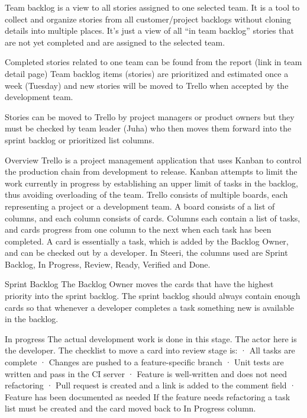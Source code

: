\documentclass[english]{tktltiki2}
\theoremstyle{definition}
\theoremstyle{remark}
\begin{document}
Team backlog is a view to all stories assigned to one selected team. It is a tool to collect and organize stories from all customer/project backlogs without cloning details into multiple places. It’s just a view of all “in team backlog” stories that are not yet completed and are assigned to the selected team.

Completed stories related to one team can be found from the report (link in team detail page)
Team backlog items (stories) are prioritized and estimated once a week (Tuesday) and new stories will be moved to Trello when accepted by the development team.

Stories can be moved to Trello by project managers or product owners but they must be checked by team leader (Juha) who then moves them forward into the sprint backlog or prioritized list columns.

Overview
Trello is a project management application that uses Kanban to control the production chain from development to release. Kanban attempts to limit the work currently in progress by establishing an upper limit of tasks in the backlog, thus avoiding overloading of the team. Trello consists of multiple boards, each representing a project or a development team. A board consists of a list of columns, and each column consists of cards. Columns each contain a list of tasks, and cards progress from one column to the next when each task has been completed. A card is essentially a task, which is added by the Backlog Owner, and can be checked out by a developer. In Steeri, the columns used are Sprint Backlog, In Progress, Review, Ready, Verified and Done. 

Sprint Backlog
The Backlog Owner moves the cards that have the highest priority into the sprint backlog. The sprint backlog should always contain enough cards so that whenever a developer completes a task something new is available in the backlog.

In progress
The actual development work is done in this stage. The actor here is the developer. The checklist to move a card into review stage is:
·       All tasks are complete
·       Changes are pushed to a feature-specific branch
·       Unit tests are written and pass in the CI server
·       Feature is well-written and does not need refactoring
·       Pull request is created and a link is added to the comment field
·       Feature has been documented as needed
If the feature needs refactoring a task list must be created and the card moved back to In Progress column.
\end{document}
